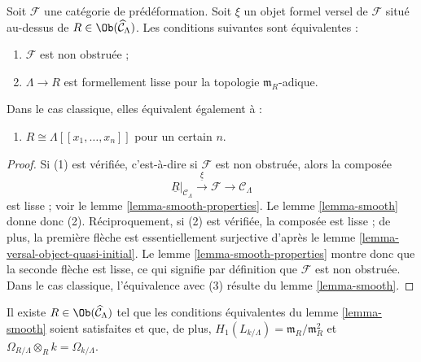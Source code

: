 \begin{lemma}
\label{lemma-smooth-power-series-classical}
Soit $\mathcal{F}$ une catégorie de prédéformation. Soit $\xi$ un objet
formel versel de $\mathcal{F}$ situé au-dessus de
$R \in \Ob(\widehat{\mathcal{C}}_\Lambda)$. Les conditions suivantes sont
équivalentes :
\begin{enumerate}
\item $\mathcal{F}$ est non obstruée ;
\item $\Lambda \to R$ est formellement lisse pour la topologie
$\mathfrak m_R$-adique.
\end{enumerate}
Dans le cas classique, elles équivalent également à :
\begin{enumerate}
\item[(3)] $R \cong \Lambda[[x_1, \ldots, x_n]]$ pour un certain $n$.\
\end{enumerate}
\end{lemma}

\begin{proof}
Si (1) est vérifiée, c'est-à-dire si $\mathcal{F}$ est non obstruée, alors la
composée
$$
\underline{R}|_{\mathcal{C}_\Lambda}
\xrightarrow{\underline{\xi}}
\mathcal{F}
\to
\mathcal{C}_\Lambda
$$
est lisse ; voir le lemme \ref{lemma-smooth-properties}. Le lemme
\ref{lemma-smooth} donne donc (2). Réciproquement, si (2) est vérifiée, la
composée est lisse ; de plus, la première flèche est essentiellement
surjective d'après le lemme \ref{lemma-versal-object-quasi-initial}. Le lemme
\ref{lemma-smooth-properties} montre donc que la seconde flèche est lisse, ce
qui signifie par définition que $\mathcal{F}$ est non obstruée. Dans le cas
classique, l'équivalence avec (3) résulte du lemme \ref{lemma-smooth}.
\end{proof}

\begin{lemma}
\label{lemma-exists-smooth}
Il existe $R \in \Ob(\widehat{\mathcal{C}}_\Lambda)$ tel que les conditions
équivalentes du lemme \ref{lemma-smooth} soient satisfaites et que, de plus,
$H_1(L_{k/\Lambda}) = \mathfrak m_R/\mathfrak m_R^2$ et
$\Omega_{R/\Lambda} \otimes_R k = \Omega_{k/\Lambda}$.
\end{lemma}

